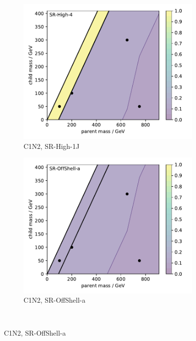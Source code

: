 \begin{figure}[tp]
\centering
\begin{subfigure}{0.495\textwidth}
\centering
\includegraphics[width=\textwidth]{figures/2ljets_signal_sys_c1n2_SRHigh4.pdf}
\caption{C1N2, SR-High-1J}
\end{subfigure}
\hfill
\begin{subfigure}{0.495\textwidth}
\centering
\includegraphics[width=\textwidth]{figures/2ljets_signal_sys_c1n2_SROffShell_1.pdf}
\caption{C1N2, SR-OffShell-a}
\end{subfigure}
\\[0.5em]

\end{figure}
